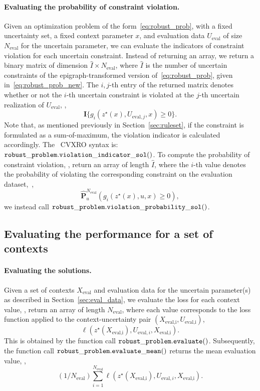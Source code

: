 \paragraph{Evaluating the probability of constraint violation.}  
Given an optimization problem of the form~\eqref{eq:robust_prob}, with a fixed uncertainty set, a fixed context parameter $x$, and evaluation data $U_\text{eval}$ of size $N_{\text{eval}}$ for the uncertain parameter, we can evaluate the indicators of constraint violation for each uncertain constraint. Instead of returning an array, we return a binary matrix of dimension $\hat{I} \times N_{\text{eval}}$, where $\hat{I}$ is the number of uncertain constraints of the epigraph-transformed version of~\eqref{eq:robust_prob}, given in~\eqref{eq:robust_prob_new}.
The $i,j$-th entry of the returned matrix denotes whether or not the $i$-th uncertain constraint is violated at the $j$-th uncertain realization of $U_{\text{eval}}$, \ie, $$\mathbf{I}\{{g_i(z^\star(x),U_{\text{eval},j},x)}\geq 0\}.$$ 
Note that, as mentioned previously in Section~\ref{sec:ruleset}, if the constraint is formulated as a sum-of-maximum, the violation indicator is calculated accordingly. The ~\gls{CVXRO} syntax is:
$\tt{robust\_problem.violation\_indicator\_sol()}$.
To compute the probability of constraint violation, \ie, return an array of length $\hat{I}$, where the $i$-th value denotes the probability of violating the corresponding constraint on the evaluation dataset,~\ie,
$$\hat{\mathbf{P}}^{N_{\text{eval}}}_u\left(g_i(z^\star(x),u,x)\geq 0\right),$$
we instead call $\tt{robust\_problem.violation\_probability\_sol()}$.


\subsection{Evaluating the performance for a set of contexts}
\label{sec:vary_context}
\paragraph{Evaluating the solutions.} Given a set of contexts $X_{\text{eval}}$ and evaluation data for the uncertain parameter(s) as described in Section~\ref{sec:eval_data}, we evaluate the loss for each context value, \ie, return an array of length $N_{\text{eval}}$, where each value corresponds to the loss function applied to the context-uncertainty pair $(X_\text{eval,i}, U_\text{eval,i})$, $$\ell(z^\star(X_{\text{eval,i}}),U_{\text{eval},i},X_{\text{eval,i}}).$$
This is obtained by the function call $\tt{robust\_problem.evaluate()}$.
Subsequently, the function call $\tt{robust\_problem.evaluate\_mean()}$ returns the mean evaluation value, \ie,
$$(1/N_{\text{eval}})\sum_{i=1}^{N_{\text{eval}}}\ell(z^\star(X_{\text{eval,i}}),U_{\text{eval},i},X_{\text{eval,i}}).$$

